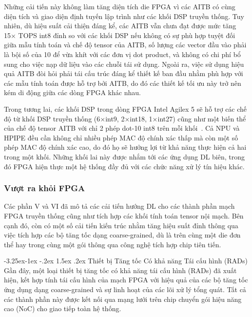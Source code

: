 \documentclass[a4paper]{article}
\makeatletter
\newcounter {subsubsubsection}[subsubsection]
\newcommand\subsubsubsection{\@startsection{subsubsubsection}{4}{\z@}%
                                     {-3.25ex\@plus -1ex \@minus -.2ex}%
                                     {1.5ex \@plus .2ex}%
                                     {\normalfont\normalsize\bfseries}}
\makeatother
\begin{document}
Những cải tiến này không làm tăng diện tích die FPGA vì các AITB có cùng diện tích và giao diện định tuyến lập trình như các khối DSP truyền thống. Tuy nhiên, dù hiệu suất cải thiện đáng kể, các AITB vẫn chưa đạt được mức tăng 15× TOPS int8 đỉnh so với các khối DSP nếu không có sự phù hợp tuyệt đối giữa mẫu tính toán và chế độ tensor của AITB, số lượng các vector đầu vào phải là bội số của 10 để vừa khít với các đơn vị dot product, và không có chi phí bổ sung cho việc nạp dữ liệu vào các chuỗi tái sử dụng. Ngoài ra, việc sử dụng hiệu quả AITB đòi hỏi phải tái cấu trúc đáng kể thiết kế ban đầu nhằm phù hợp với các mẫu tính toán được hỗ trợ bởi AITB, do đó các thiết kế tối ưu này trở nên kém di động giữa các dòng FPGA khác nhau.

Trong tương lai, các khối DSP trong dòng FPGA Intel Agilex 5 sẽ hỗ trợ các chế độ từ khối DSP truyền thống (6×int9, 2×int18, 1×int27) cũng như một biến thể của chế độ tensor AITB với chỉ 2 phép dot-10 int8 trên mỗi khối~\cite{118}. Cả NPU và HPIPE đều cần không chỉ nhiều phép MAC độ chính xác thấp mà còn một số phép MAC độ chính xác cao, do đó họ sẽ hưởng lợi từ khả năng thực hiện cả hai trong một khối. Những khối lai này được nhắm tới các ứng dụng DL biên, trong đó FPGA hiện thực một hệ thống đầy đủ với các chức năng xử lý tín hiệu khác.




\subsubsection{Vượt ra khỏi FPGA}
Các phần V và VI đã mô tả các cải tiến hướng DL cho các thành phần mạch FPGA truyền thống cũng như tích hợp các khối tính toán tensor nội mạch. Bên cạnh đó, còn có một số cải tiến kiến trúc nhằm tăng hiệu suất đỉnh thông qua việc tích hợp các bộ tăng tốc dạng coarse-grained, dù là trên cùng một die đơn thể hay trong cùng một gói thông qua công nghệ tích hợp chip tiên tiến.

\subsubsubsection{Thiết bị Tăng tốc Có khả năng Tái cấu hình (RADs)}
Gần đây, một loại thiết bị tăng tốc có khả năng tái cấu hình (RADs) đã xuất hiện, kết hợp tính tái cấu hình của mạch FPGA với hiệu quả của các bộ tăng tốc ứng dụng dạng coarse-grained và sự linh hoạt của các lõi xử lý tổng quát. Tất cả các thành phần này được kết nối qua mạng lưới trên chip chuyển gói hiệu năng cao (NoC) cho giao tiếp toàn hệ thống.
\end{document}
